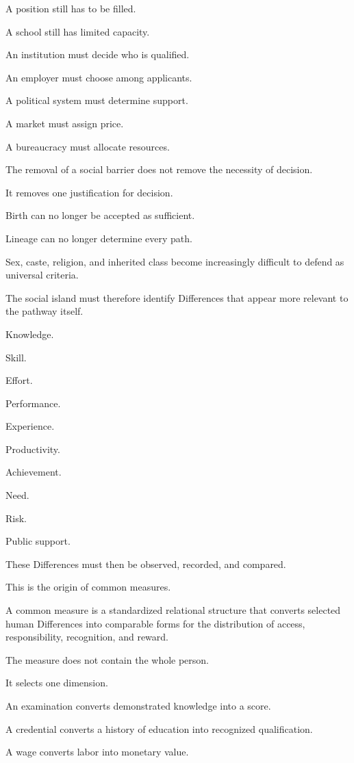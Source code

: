 A position still has to be filled.

A school still has limited capacity.

An institution must decide who is qualified.

An employer must choose among applicants.

A political system must determine support.

A market must assign price.

A bureaucracy must allocate resources.

The removal of a social barrier does not remove the necessity of decision.

It removes one justification for decision.

Birth can no longer be accepted as sufficient.

Lineage can no longer determine every path.

Sex, caste, religion, and inherited class become increasingly difficult to defend as universal criteria.

The social island must therefore identify Differences that appear more relevant to the pathway itself.

Knowledge.

Skill.

Effort.

Performance.

Experience.

Productivity.

Achievement.

Need.

Risk.

Public support.

These Differences must then be observed, recorded, and compared.

This is the origin of common measures.

A common measure is a standardized relational structure that converts selected human Differences into comparable forms for the distribution of access, responsibility, recognition, and reward.

The measure does not contain the whole person.

It selects one dimension.

An examination converts demonstrated knowledge into a score.

A credential converts a history of education into recognized qualification.

A wage converts labor into monetary value.

